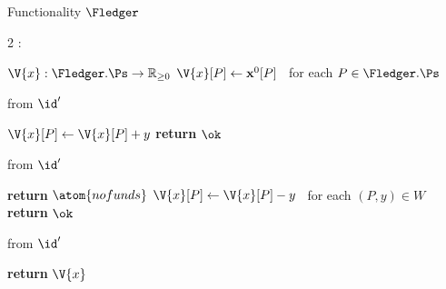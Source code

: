 \begin{interface}[nofloat]{Functionality $\Fledger$ \\
}

{\scriptsize
\setlength{\columnsep}{1.4em}
\begin{multicols}{2}
:
\begin{algorithmic}[1]
\setcounter{contline}{0}\algcont
\State $\V{x} : \Fledger.\Ps \to \mathbb{R}_{\geq 0}$
\State $\V{x}[P] \gets \mathbf{x}^{0}[P]$ \ for each $P \in \Fledger.\Ps$ \label{ln:ledinit}
\algsave
\end{algorithmic}
\vspace{1.4ex}

 \quad from $\id'$
\begin{algorithmic}[1]
\algcont
{} \label{ln:lednoparty}
\State $\V{x}[P] \gets \V{x}[P] + y$ \label{ln:ledadd}
\State \textbf{return} $\ok$
\algsave
\end{algorithmic}
\vspace{1.4ex}

\columnbreak

 \quad from $\id'$
\begin{algorithmic}[1]
\algcont
{}
 \label{ln:ledonce}
  \State \textbf{return} $\atom{nofunds}$ \label{ln:ledatomic}
\EndIf
\State $\V{x}[P] \gets \V{x}[P] - y$ \ for each $(P, y) \in W$ \label{ln:ledremove}
\State \textbf{return} $\ok$
\algsave
\end{algorithmic}
\vspace{1.4ex}

 \quad from $\id'$
\begin{algorithmic}[1]
\algcont
\State \textbf{return} $\V{x}$ \label{ln:ledpublic}
\algsave
\end{algorithmic}
\end{multicols}}
\end{interface}
